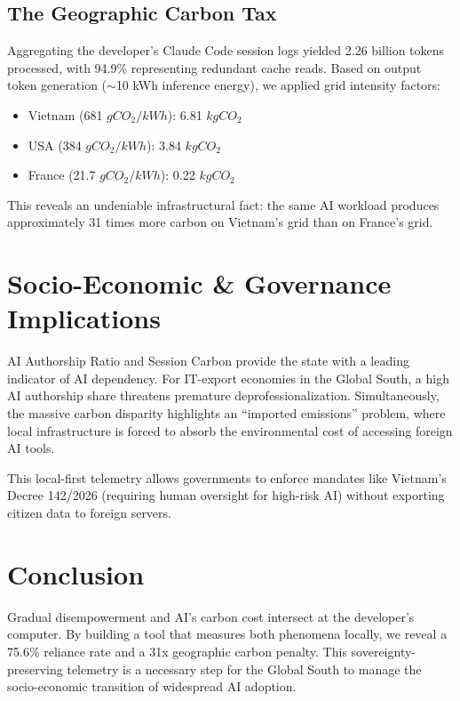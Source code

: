 \documentclass[11pt,a4paper]{article}
\begin{document}
\subsection{The Geographic Carbon Tax}
Aggregating the developer's Claude Code session logs yielded 2.26 billion tokens processed, with 94.9\% representing redundant cache reads. Based on output token generation ($\sim$10 kWh inference energy), we applied grid intensity factors:
\begin{itemize}
    \item Vietnam (681 $gCO_2/kWh$): 6.81 $kgCO_2$
    \item USA (384 $gCO_2/kWh$): 3.84 $kgCO_2$
    \item France (21.7 $gCO_2/kWh$): 0.22 $kgCO_2$
\end{itemize}
This reveals an undeniable infrastructural fact: the same AI workload produces approximately 31 times more carbon on Vietnam's grid than on France's grid.

\section{Socio-Economic \& Governance Implications}
AI Authorship Ratio and Session Carbon provide the state with a leading indicator of AI dependency. For IT-export economies in the Global South, a high AI authorship share threatens premature deprofessionalization. Simultaneously, the massive carbon disparity highlights an ``imported emissions'' problem, where local infrastructure is forced to absorb the environmental cost of accessing foreign AI tools.

This local-first telemetry allows governments to enforce mandates like Vietnam's Decree 142/2026 (requiring human oversight for high-risk AI) without exporting citizen data to foreign servers.

\section{Conclusion}
Gradual disempowerment and AI's carbon cost intersect at the developer's computer. By building a tool that measures both phenomena locally, we reveal a 75.6\% reliance rate and a 31x geographic carbon penalty. This sovereignty-preserving telemetry is a necessary step for the Global South to manage the socio-economic transition of widespread AI adoption.
\end{document}
